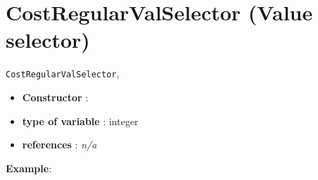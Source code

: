 \section{CostRegularValSelector (Value selector)}\label{costregularvalselector:costregularvalselectorvalselector}\hypertarget{costregularvalselector:costregularvalselectorvalselector}{}
\begin{notedef}
  \texttt{CostRegularValSelector}, 
\end{notedef}

\begin{itemize}
	\item \textbf{Constructor} : 
	\item \textbf{type of variable} : integer
	\item \textbf{references} : \emph{n/a}
\end{itemize}

\textbf{Example}:
%

